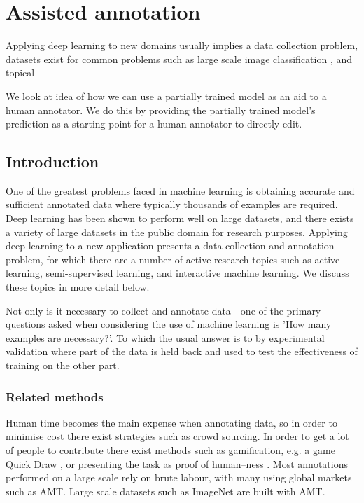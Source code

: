 


\chapter{Assisted annotation}
 

Applying deep learning to new domains usually implies a data collection problem, datasets exist for common problems such as large scale image classification , and topical 

We look at idea of how we can use a partially trained model as an aid to a human annotator. We do this by providing the partially trained model's prediction as a starting point for a human annotator to directly edit. 




\section {Introduction}


One of the greatest problems faced in machine learning is obtaining accurate and sufficient annotated data where typically thousands of examples are required. Deep learning has been shown to perform well on large datasets, and there exists a variety of large datasets in the public domain for research purposes. Applying deep learning to a new application presents a data collection and annotation problem, for which there are a number of active research topics such as active learning, semi-supervised learning, and interactive machine learning. We discuss these topics in more detail below.

Not only is it necessary to collect and annotate data - one of the primary questions asked when considering the use of machine learning is 'How many examples are necessary?'. To which the usual answer is to by experimental validation where part of the data is held back and used to test the effectiveness of training on the other part.


\subsection{Related methods}


Human time becomes the main expense when annotating data, so in order to minimise cost there exist strategies such as crowd sourcing. In order to get a lot of people to contribute there exist methods such as gamification, e.g. a game Quick Draw \cite{Ha2017}, or presenting the task as proof of human--ness \cite{Goodfellow2013a}.  Most annotations performed on a large scale rely on brute labour, with many using global markets such as \gls{AMT}. Large scale datasets such as ImageNet \cite{Russakovsky2015} are built with \gls{AMT}. 

